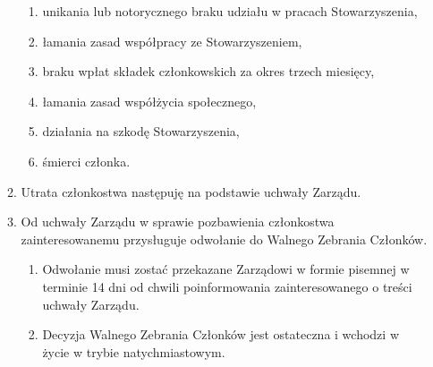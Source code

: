\documentclass{article}
\begin{document}
\begin{enumerate}
\begin{enumerate}
\begin{enumerate}
            \item unikania lub notorycznego braku udziału w pracach Stowarzyszenia,
            \item łamania zasad współpracy ze Stowarzyszeniem,
            \item braku wpłat składek członkowskich za okres trzech miesięcy,
            \item łamania zasad współżycia społecznego,
            \item działania na szkodę Stowarzyszenia,
            \item śmierci członka.
          \end{enumerate}
        \item Utrata członkostwa następuję na podstawie uchwały Zarządu.
        \item Od uchwały Zarządu w sprawie pozbawienia członkostwa zainteresowanemu przysługuje odwołanie do Walnego Zebrania Członków.
          \begin{enumerate}
            \item Odwołanie musi zostać przekazane Zarządowi w formie pisemnej w terminie 14 dni od chwili poinformowania zainteresowanego o treści uchwały Zarządu.
            \item Decyzja Walnego Zebrania Członków jest ostateczna i wchodzi w życie w trybie natychmiastowym.
          \end{enumerate}
      \end{enumerate}
  \end{enumerate}
\end{document}
